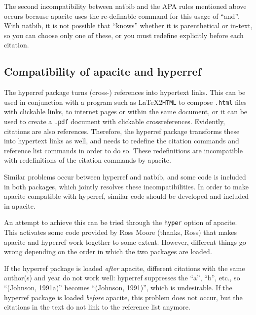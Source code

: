\documentclass{article}
\newcommand{\latextohtml}{\textup{\LaTeX2\texttt{HTML}}}%
\newcommand{\pkg}[1]{\textsf{#1}}%
\newcommand{\fname}[1]{\texttt{#1}}%
\newcommand{\pkgoption}[1]{\texttt{#1}}%
\newcommand{\cmd}[1]{\texttt{\string#1}}%
\begin{document}
The second incompatibility between \pkg{natbib} and the APA rules mentioned
above occurs because \pkg{apacite} uses the re-definable \cmd{\BBA}
command for this usage of ``and''. With \pkg{natbib}, it is not possible
that \cmd{\BBA} ``knows'' whether it is parenthetical or in-text, so you can
choose only one of these, or you must redefine \cmd{\BBA} explicitly before
each citation.

\subsection{Compatibility of \pkg{apacite} and \pkg{hyperref}}
\label{sec:compat-hyper}
The \pkg{hyperref} package turns (cross-) references into hypertext links.
This can be used in conjunction with a program such as \latextohtml{} to
compose \fname{.html} files with clickable links, to internet pages or within
the same document, or it can be used to create a \fname{.pdf} document with
clickable crossreferences. Evidently, citations are also references.
Therefore, the \pkg{hyperref} package transforms these into hypertext links as
well, and needs to redefine the citation commands and reference list commands
in order to do so. These redefinitions are incompatible with redefinitions of
the citation commands by \pkg{apacite}.

Similar problems occur between \pkg{hyperref} and \pkg{natbib}, and some code
is included in both packages, which jointly resolves these incompatibilities.
In order to make \pkg{apacite} compatible with \pkg{hyperref}, similar code
should be developed and included in \pkg{apacite}.

An attempt to achieve this can be tried through the \pkgoption{hyper} option
of \pkg{apacite}. This activates some code provided by Ross Moore (thanks,
Ross) that makes \pkg{apacite} and \pkg{hyperref} work together to some
extent. However, different things go wrong depending on the order in which the
two packages are loaded.

If the \pkg{hyperref} package is loaded \emph{after} \pkg{apacite}, different
citations with the same author(s) and year do not work well: \pkg{hyperref}
suppresses the ``a'', ``b'', etc., so ``(Johnson, 1991a)'' becomes ``(Johnson,
1991)'', which is undesirable. If the \pkg{hyperref} package is loaded
\emph{before} \pkg{apacite}, this problem does not occur, but the citations in
the text do not link to the reference list anymore.
\end{document}
